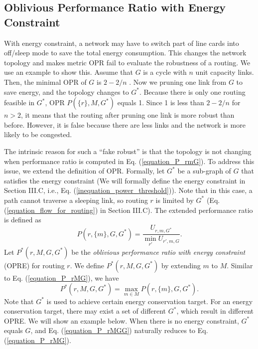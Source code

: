 \documentclass[conference]{IEEEtran}
\begin{document}
\subsection{Oblivious Performance Ratio with Energy Constraint}

With energy constraint, a network may have to switch part of line cards into off/sleep mode to save the total energy consumption. This changes the network topology and makes metric OPR fail to evaluate the robustness of a routing. We use an example to show this. Assume that $G$ is a cycle with $n$ unit capacity links. Then, the minimal OPR of $G$ is $2-2/n$ \cite{networking:oblivious}. Now we pruning one link from $G$ to save energy, and the topology changes to $G^*$. Because there is only one routing feasible in $G^*$, OPR $P(\{ r \}, M, G^*)$ equals 1. Since 1 is less than $2-2/n$ for $n > 2$, it means that the routing after pruning one link is more robust than before. However, it is false because there are less links and the network is more likely to be congested.

The intrinsic reason for such a ``fake robust'' is that the topology is not changing when performance ratio is computed in Eq. (\ref{equation_P_rmG}). To address this issue, we extend the definition of OPR. Formally, let $G^*$ be a sub-graph of $G$ that satisfies the energy constraint (We will formally define the energy constraint in Section III.C, i.e., Eq. (\ref{inequation_power_threshold})). Note that in this case, a path cannot traverse a sleeping link, so routing $r$ is limited by $G^*$ (Eq. (\ref{equation_flow_for_routing}) in Section III.C). The extended performance ratio is defined as
\begin{equation}
\label{equation_P_rmGG}
	P(r, \{ m \}, G, G^*) = \frac{U_{r,m,G^*}}{\min_{r'} U_{r', m, G}}.
\end{equation}
Let $P^*(r, M, G, G^*)$ be the \emph{oblivious performance ratio with energy constraint} (OPRE) for routing $r$. We define $P^*(r, M, G, G^*)$ by extending $m$ to $M$. Similar to Eq. (\ref{equation_P_rMG}), we have
\begin{equation}
\label{equation_P_rMGG}
	P^*(r, M, G, G^*) = \max_{m\in M} P(r, \{ m \}, G, G^*).
\end{equation}
Note that $G^*$ is used to achieve certain energy conservation target. For an energy conservation target, there may exist a set of different $G^*$, which result in different OPRE. We will show an example below. When there is no energy constraint, $G^*$ equals $G$, and Eq. (\ref{equation_P_rMGG}) naturally reduces to Eq. (\ref{equation_P_rMG}).
\end{document}
